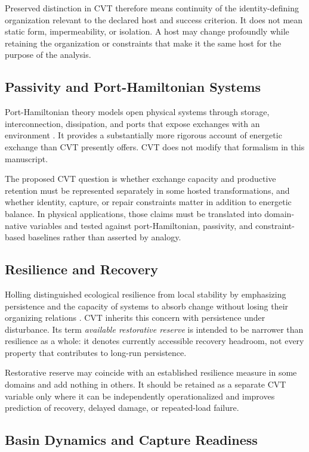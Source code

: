 Preserved distinction in CVT therefore means continuity of the identity-defining organization relevant to the declared host and success criterion. It does not mean static form, impermeability, or isolation. A host may change profoundly while retaining the organization or constraints that make it the same host for the purpose of the analysis.

\subsection{Passivity and Port-Hamiltonian Systems}

Port-Hamiltonian theory models open physical systems through storage, interconnection, dissipation, and ports that expose exchanges with an environment \cite{vanderschaft2014}. It provides a substantially more rigorous account of energetic exchange than CVT presently offers. CVT does not modify that formalism in this manuscript.

The proposed CVT question is whether exchange capacity and productive retention must be represented separately in some hosted transformations, and whether identity, capture, or repair constraints matter in addition to energetic balance. In physical applications, those claims must be translated into domain-native variables and tested against port-Hamiltonian, passivity, and constraint-based baselines rather than asserted by analogy.

\subsection{Resilience and Recovery}

Holling distinguished ecological resilience from local stability by emphasizing persistence and the capacity of systems to absorb change without losing their organizing relations \cite{holling1973}. CVT inherits this concern with persistence under disturbance. Its term \emph{available restorative reserve} is intended to be narrower than resilience as a whole: it denotes currently accessible recovery headroom, not every property that contributes to long-run persistence.

Restorative reserve may coincide with an established resilience measure in some domains and add nothing in others. It should be retained as a separate CVT variable only where it can be independently operationalized and improves prediction of recovery, delayed damage, or repeated-load failure.

\subsection{Basin Dynamics and Capture Readiness}

